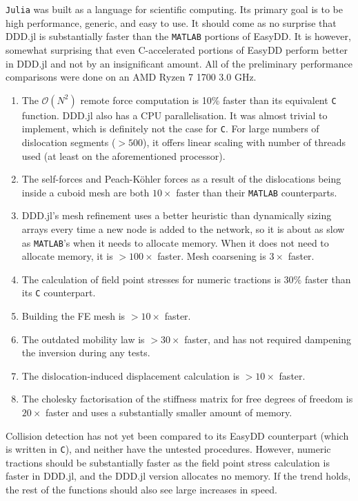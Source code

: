 \texttt{Julia} was built as a language for scientific computing. Its primary goal is to be high performance, generic, and easy to use. It should come as no surprise that DDD.jl is substantially faster than the \texttt{MATLAB} portions of EasyDD. It is however, somewhat surprising that even C-accelerated portions of EasyDD perform better in DDD.jl and not by an insignificant amount. All of the preliminary performance comparisons were done on an AMD Ryzen 7 1700 \@ 3.0 GHz.
\begin{enumerate}
    \item The $\mathcal{O}(N^2)$ remote force computation is 10\% faster than its equivalent \texttt{C} function. DDD.jl also has a CPU parallelisation. It was almost trivial to implement, which is definitely not the case for \texttt{C}. For large numbers of dislocation segments ($>500$), it offers linear scaling with number of threads used (at least on the aforementioned processor).
    \item The self-forces and Peach-K\"{o}hler forces as a result of the dislocations being inside a cuboid mesh are both $10\times$ faster than their \texttt{MATLAB} counterparts.
    \item DDD.jl's mesh refinement uses a better heuristic than dynamically sizing arrays every time a new node is added to the network, so it is about as slow as \texttt{MATLAB}'s when it needs to allocate memory. When it does not need to allocate memory, it is $>100\times$ faster. Mesh coarsening is $3\times$ faster.
    \item The calculation of field point stresses for numeric tractions is $30\%$ faster than its \texttt{C} counterpart.
    \item Building the FE mesh is $>10\times$ faster.
    \item The outdated mobility law is $>30\times$ faster, and has not required dampening the inversion during any tests.
    \item The dislocation-induced displacement calculation is $>10\times$ faster.
    \item The cholesky factorisation of the stiffness matrix for free degrees of freedom is $20\times$ faster and uses a substantially smaller amount of memory.
\end{enumerate}
Collision detection has not yet been compared to its EasyDD counterpart (which is written in \texttt{C}), and neither have the untested procedures. However, numeric tractions should be substantially faster as the field point stress calculation is faster in DDD.jl, and the DDD.jl version allocates no memory. If the trend holds, the rest of the functions should also see large increases in speed.

